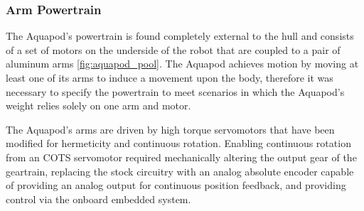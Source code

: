 \subsubsection{Arm Powertrain}
\label{arm_motors}
The Aquapod's powertrain is found completely external to the hull and consists of a set of motors on the underside of the robot that are coupled to a pair of aluminum arms \ref{fig:aquapod_pool}. The Aquapod achieves motion by moving at least one of its arms to induce a movement upon the body, therefore it was necessary to specify the powertrain to meet scenarios in which the Aquapod's weight relies solely on one arm and motor. 


The Aquapod's arms are driven by high torque servomotors that have been modified for hermeticity and continuous rotation. Enabling continuous rotation from an COTS servomotor required mechanically altering the output gear of the geartrain, replacing the stock circuitry with an analog absolute encoder capable of providing an analog output for continuous position feedback, and providing control via the onboard embedded system. 



